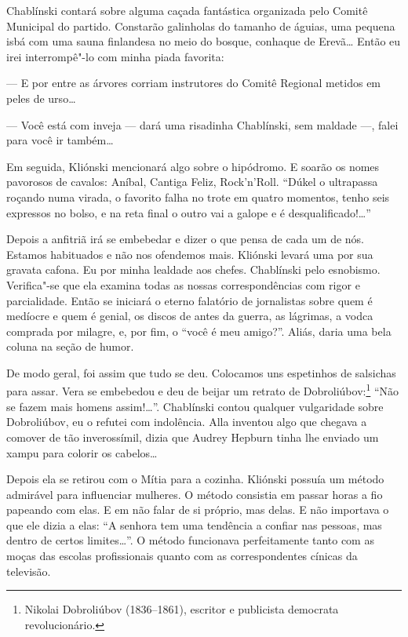Chablínski contará sobre alguma caçada fantástica organizada pelo Comitê Municipal do
partido. Constarão galinholas do tamanho de águias, uma pequena isbá com
uma sauna finlandesa no meio do bosque, conhaque de Erevã\ldots{} Então eu
irei interrompê"-lo com minha piada favorita:

--- E por entre as árvores corriam instrutores do Comitê Regional
metidos em peles de urso\ldots{}

--- Você está com inveja --- dará uma risadinha Chablínski, sem maldade
---, falei para você ir também\ldots{}

Em seguida, Kliónski mencionará algo sobre o hipódromo. E soarão os
nomes pavorosos de cavalos: Aníbal, Cantiga Feliz, Rock'n'Roll. ``Dúkel o ultrapassa roçando numa virada, o favorito falha no trote em quatro momentos, tenho seis expressos no bolso, e na reta final o outro vai a galope e é desqualificado!\ldots{}''

Depois a anfitriã irá se embebedar e dizer o que pensa de cada um de
nós. Estamos habituados e não nos ofendemos mais. Kliónski levará uma
por sua gravata cafona. Eu por minha lealdade aos chefes. Chablínski
pelo esnobismo. Verifica"-se que ela examina todas as nossas
correspondências com rigor e parcialidade. Então se iniciará o eterno
falatório de jornalistas sobre quem é medíocre e quem é genial, os
discos de antes da guerra, as lágrimas, a vodca comprada por milagre, e,
por fim, o ``você é meu amigo?''. Aliás, daria uma bela coluna na seção
de humor.

De modo geral, foi assim que tudo se deu. Colocamos uns espetinhos de
salsichas para assar. Vera se embebedou e deu de beijar um retrato de
Dobroliúbov:\footnote{Nikolai Dobroliúbov (1836--1861), escritor e
  publicista democrata revolucionário.} ``Não se fazem mais homens
assim!\ldots{}''. Chablínski contou qualquer vulgaridade sobre Dobroliúbov,
eu o refutei com indolência. Alla inventou algo que chegava a comover de
tão inverossímil, dizia que Audrey Hepburn tinha lhe enviado um xampu
para colorir os cabelos\ldots{}

Depois ela se retirou com o Mítia para a cozinha. Kliónski possuía um
método admirável para influenciar mulheres. O método consistia em passar
horas a fio papeando com elas. E em não falar de si próprio, mas delas.
E não importava o que ele dizia a elas: ``A senhora tem uma tendência a
confiar nas pessoas, mas dentro de certos limites\ldots{}''. O método
funcionava perfeitamente tanto com as moças das escolas profissionais
quanto com as correspondentes cínicas da televisão.

